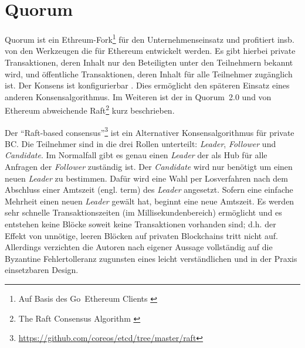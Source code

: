 \section{Quorum}\label{impl:quorum}

Quorum ist ein Ethreum-Fork\footnote{Auf Basis des Go~Ethereum Clients \autocite{}} für den Unternehmenseinsatz und profitiert insb. von den Werkzeugen die für Ethereum entwickelt werden. Es gibt hierbei private Transaktionen, deren Inhalt nur den Beteiligten unter den Teilnehmern bekannt wird, und öffentliche Transaktionen, deren Inhalt für alle Teilnehmer zugänglich ist. Der Konsens ist konfigurierbar%
. Dies ermöglicht den späteren Einsatz eines anderen Konsensalgorithmus. Im Weiteren ist der in Quorum~2.0 und von Ethereum abweichende Raft\footnote{The Raft Consensus Algorithm \autocite{p:raft}} kurz beschrieben.


Der \enquote{Raft-based consensus}\footnote{\url{https://github.com/coreos/etcd/tree/master/raft}} ist ein Alternativer Konsensalgorithmus für private \gls{BC}. Die Teilnehmer sind in die drei Rollen unterteilt:  \emph{Leader}, \emph{Follower} und \emph{Candidate}. Im Normalfall gibt es genau einen \emph{Leader} der als Hub für alle Anfragen der \emph{Follower} zuständig ist. Der \emph{Candidate} wird nur benötigt um einen neuen \emph{Leader} zu bestimmen. Dafür wird eine Wahl per Losverfahren nach dem Abschluss einer Amtszeit (engl. term) des \emph{Leader} angesetzt. Sofern eine einfache Mehrheit einen neuen \emph{Leader} gewält hat, beginnt eine neue Amtszeit. Es werden sehr schnelle Transaktionszeiten (im Millisekundenbereich) ermöglicht und es entstehen keine Blöcke soweit keine Transaktionen vorhanden sind; d.h. der Effekt von unnötige, leeren Blöcken auf privaten Blockchains tritt nicht auf. Allerdings verzichten die Autoren nach eigener Aussage vollständig auf die Byzantine Fehlertolleranz zugunsten eines leicht verständlichen und in der Praxis einsetzbaren Design. 

